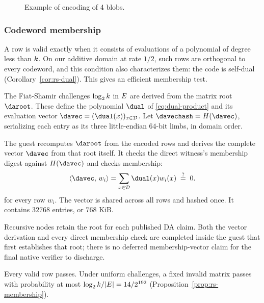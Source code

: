 \begin{figure}[htbp]
\caption{Example of encoding of 4 blobs.}
\label{fig:da-hashing}
\end{figure}

\subsubsection{Codeword membership}\label{sec:da-membership}\label{sec:da-circuit}

A row is valid exactly when it consists of evaluations of a polynomial of degree less than $k$. On our additive domain at rate $1/2$, such rows are orthogonal to every codeword, and this condition also characterizes them: the code is self-dual (Corollary~\ref{cor:rs-dual}). This gives an efficient membership test.

The Fiat-Shamir challenges $\log_2k$ in $E$ are derived from the matrix root $\daroot$. These define the polynomial $\dual$ of \eqref{eq:dual-product} and its evaluation vector $\davec=(\dual(x))_{x\in\dom}$. Let $\davechash=H(\davec)$, serializing each entry as its three little-endian $64$-bit limbs, in domain order.

The guest recomputes $\daroot$ from the encoded rows and derives the complete vector $\davec$ from that root itself. It checks the direct witness's membership digest against $H(\davec)$ and checks membership:
\[
  \inner{\davec}{w_i}
  =\sum_{x\in\dom}\dual(x)w_i(x)
  \;\qeq\;0.
\]
for every row $w_i$. The vector is shared across all rows and hashed once. It contains $32768$ entries, or $768$ KiB.

Recursive nodes retain the root for each published DA claim. Both the vector derivation and every direct membership check are completed inside the guest that first establishes that root; there is no deferred membership-vector claim for the final native verifier to discharge.

Every valid row passes. Under uniform challenges, a fixed invalid matrix passes with probability at most $\log_2k/|E|=14/2^{192}$ (Proposition~\ref{prop:rs-membership}).
